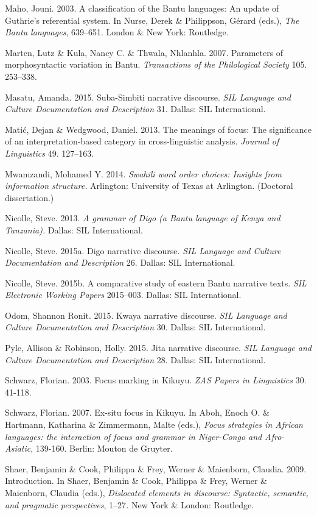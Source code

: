 \documentclass[output=paper]{langsci/langscibook}
\begin{document}
Maho, Jouni. 2003. A classification of the Bantu languages: An update of Guthrie’s referential system. In Nurse, Derek \& Philippson, Gérard (eds.), \textit{The Bantu languages}, 639–651. London \& New York: Routledge.

Marten, Lutz \& Kula, Nancy C. \& Thwala, Nhlanhla. 2007. Parameters of morphosyntactic variation in Bantu. \textit{Transactions of the Philological Society} 105. 253–338.

Masatu, Amanda. 2015. Suba-Simbiti narrative discourse. \textit{SIL Language and }\textit{Culture Documentation and Description} 31. Dallas: SIL International.

Matić, Dejan \& Wedgwood, Daniel. 2013. The meanings of focus: The significance of an interpretation-based category in cross-linguistic analysis. \textit{Journal of Linguistics} 49. 127–163.

Mwamzandi, Mohamed Y. 2014. \textit{Swahili word order choices: Insights from information structure.} Arlington: University of Texas at Arlington. (Doctoral dissertation.)

Nicolle, Steve. 2013. \textit{A grammar of Digo (a Bantu language of Kenya and Tanzania).} Dallas: SIL International.

Nicolle, Steve. 2015a. Digo narrative discourse. \textit{SIL Language and Culture Documentation and Description }26. Dallas: SIL International.

Nicolle, Steve. 2015b. A comparative study of eastern Bantu narrative texts. \textit{SIL Electronic Working Papers }2015–003. Dallas: SIL International.

Odom, Shannon Ronit. 2015. Kwaya narrative discourse. \textit{SIL Language and Culture Documentation and Description} 30. Dallas: SIL International.

Pyle, Allison \& Robinson, Holly. 2015. Jita narrative discourse. \textit{SIL Language and C}\textit{ulture Documentation and Description} 28. Dallas: SIL International.

Schwarz, Florian. 2003. Focus marking in Kikuyu. \textit{ZAS Papers in Linguistics} 30. 41-118.

Schwarz, Florian. 2007. Ex-situ focus in Kikuyu. In Aboh, Enoch O. \& Hartmann, Katharina \& Zimmermann, Malte (eds.), \textit{Focus strategies in African languages: the interaction of focus and grammar in Niger-Congo and Afro-Asiatic}, 139-160. Berlin: Mouton de Gruyter.

Shaer, Benjamin \& Cook, Philippa \& Frey, Werner \& Maienborn, Claudia. 2009. Introduction. In Shaer, Benjamin \& Cook, Philippa \& Frey, Werner \& Maienborn, Claudia (eds.), \textit{Dislocated elements in discourse: Syntactic, semantic, and pragmatic}\textit{ perspectives}, 1–27\textit{.} New York \& London: Routledge.
\end{document}
